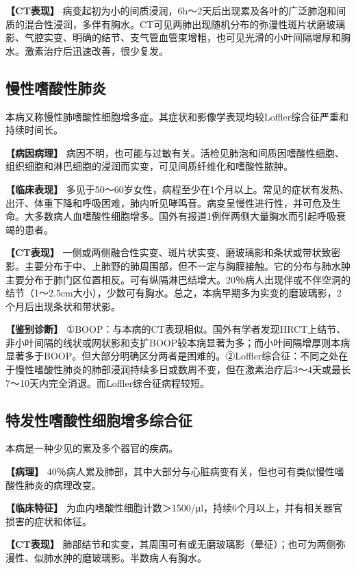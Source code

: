 \textbf{【CT表现】}
病变起初为小的间质浸润，6h～2天后出现累及各叶的广泛肺泡和间质的混合性浸润，多伴有胸水。CT可见两肺出现随机分布的弥漫性斑片状磨玻璃影、气腔实变、明确的结节、支气管血管束增粗，也可见光滑的小叶间隔增厚和胸水。激素治疗后迅速改善，很少复发。

\subsection{慢性嗜酸性肺炎}

本病又称慢性肺嗜酸性细胞增多症。其症状和影像学表现均较Loffler综合征严重和持续时间长。

\textbf{【病因病理】}
病因不明，也可能与过敏有关。活检见肺泡和间质因嗜酸性细胞、组织细胞和淋巴细胞的浸润而实变，可见间质纤维化和嗜酸性脓肿。

\textbf{【临床表现】}
多见于50～60岁女性，病程至少在1个月以上。常见的症状有发热、出汗、体重下降和呼吸困难，肺内听见哮鸣音。病变呈慢性进行性，并可危及生命。大多数病人血嗜酸性细胞增多。国外有报道1例伴两侧大量胸水而引起呼吸衰竭的患者。

\textbf{【CT表现】}
一侧或两侧融合性实变、斑片状实变、磨玻璃影和条状或带状致密影。主要分布于中、上肺野的肺周围部，但不一定与胸膜接触。它的分布与肺水肿主要分布于肺门区位置相反。可有纵隔淋巴结增大。20％病人出现伴或不伴空洞的结节（1～2.5cm大小），少数可有胸水。总之，本病早期多为实变的磨玻璃影，2个月后出现条状和带状影。

\textbf{【鉴别诊断】}
①BOOP：与本病的CT表现相似。国外有学者发现HRCT上结节、非小叶间隔的线状或网状影和支扩BOOP较本病显著为多；而小叶间隔增厚则本病显著多于BOOP。但大部分明确区分两者是困难的。②Loffler综合征：不同之处在于慢性嗜酸性肺炎的肺部浸润持续多日或数周不变，但在激素治疗后3～4天或最长7～10天内完全消退。而Loffler综合征病程较短。

\subsection{特发性嗜酸性细胞增多综合征}

本病是一种少见的累及多个器官的疾病。

\textbf{【病理】}
40％病人累及肺部，其中大部分与心脏病变有关，但也可有类似慢性嗜酸性肺炎的病理改变。

\textbf{【临床特征】}
为血内嗜酸性细胞计数＞1500/μl，持续6个月以上，并有相关器官损害的症状和体征。

\textbf{【CT表现】}
肺部结节和实变，其周围可有或无磨玻璃影（晕征）；也可为两侧弥漫性、似肺水肿的磨玻璃影。半数病人有胸水。

